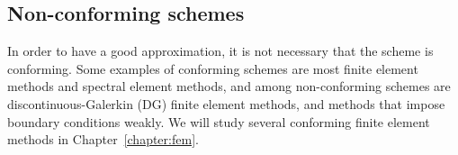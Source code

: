 \subsection{Non-conforming schemes}\label{sec:non-conforming-schemes}
In order to have a good approximation, it is not necessary that the scheme is conforming. Some examples of conforming schemes are most finite element methods and spectral element methods, and among non-conforming schemes are discontinuous-Galerkin (DG) finite element methods, and methods that impose boundary conditions weakly. We will study several conforming finite element methods in Chapter~\ref{chapter:fem}. 

